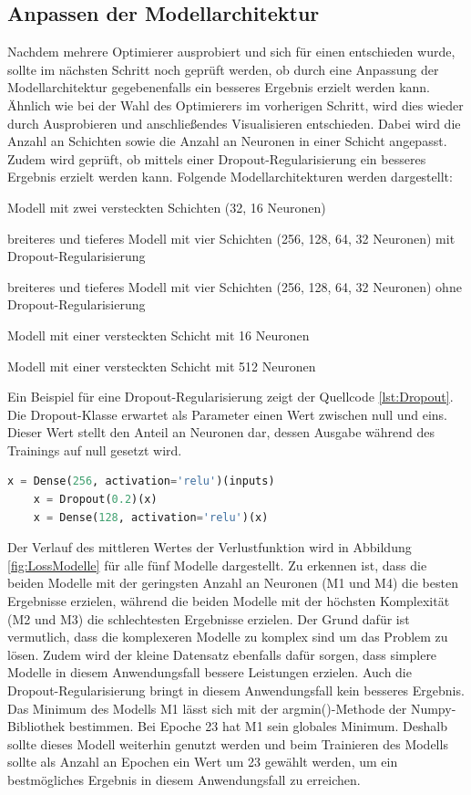 \subsection{Anpassen der Modellarchitektur}
Nachdem mehrere Optimierer ausprobiert und sich für einen entschieden wurde, sollte im nächsten Schritt noch geprüft werden, ob durch eine Anpassung der Modellarchitektur
gegebenenfalls ein besseres Ergebnis erzielt werden kann. Ähnlich wie bei der Wahl des Optimierers im vorherigen Schritt, wird dies wieder durch Ausprobieren und 
anschließendes Visualisieren entschieden. Dabei wird die Anzahl an Schichten sowie die Anzahl an Neuronen in einer Schicht angepasst.
Zudem wird geprüft, ob mittels einer Dropout-Regularisierung ein besseres Ergebnis erzielt werden kann. 
Folgende Modellarchitekturen werden dargestellt:
\begin{description}[style=multiline,leftmargin=3cm,font=\bfseries, nolistsep]
    \item[M1] Modell mit zwei versteckten Schichten (32, 16 Neuronen)
    \item[M2] breiteres und tieferes Modell mit vier Schichten (256, 128, 64, 32 Neuronen) mit Dropout-Regularisierung
    \item[M3] breiteres und tieferes Modell mit vier Schichten (256, 128, 64, 32 Neuronen) ohne Dropout-Regularisierung
    \item[M4] Modell mit einer versteckten Schicht mit 16 Neuronen
    \item[M5] Modell mit einer versteckten Schicht mit 512 Neuronen
\end{description}
Ein Beispiel für eine Dropout-Regularisierung zeigt der Quellcode \ref*{lst:Dropout}. Die Dropout-Klasse erwartet als Parameter einen Wert zwischen null und eins. 
Dieser Wert stellt den Anteil an Neuronen dar, dessen Ausgabe während des Trainings auf null gesetzt wird.
\begin{lstlisting}[language = python, caption={Dropout-Regularisierung mit Keras},captionpos=b, label = lst:Dropout, floatplacement=H]
    x = Dense(256, activation='relu')(inputs)
    x = Dropout(0.2)(x)
    x = Dense(128, activation='relu')(x)
\end{lstlisting}
Der Verlauf des mittleren Wertes der Verlustfunktion wird in Abbildung \ref*{fig:LossModelle} für alle fünf Modelle dargestellt. Zu erkennen ist, dass die beiden Modelle mit 
der geringsten Anzahl an Neuronen (M1 und M4) die besten Ergebnisse erzielen, während die beiden Modelle mit der höchsten Komplexität (M2 und M3) die schlechtesten Ergebnisse
erzielen. Der Grund dafür ist vermutlich, dass die komplexeren Modelle zu komplex sind um das Problem zu lösen. Zudem wird der kleine Datensatz ebenfalls dafür sorgen,
dass simplere Modelle in diesem Anwendungsfall bessere Leistungen erzielen. Auch die Dropout-Regularisierung bringt in diesem Anwendungsfall kein besseres Ergebnis. Das Minimum
des Modells M1 lässt sich mit der argmin()-Methode der Numpy-Bibliothek bestimmen. Bei Epoche 23 hat M1 sein globales Minimum. Deshalb sollte dieses Modell weiterhin genutzt werden
und beim Trainieren des Modells sollte als Anzahl an Epochen ein Wert um 23 gewählt werden, um ein bestmögliches Ergebnis in diesem Anwendungsfall zu erreichen.

